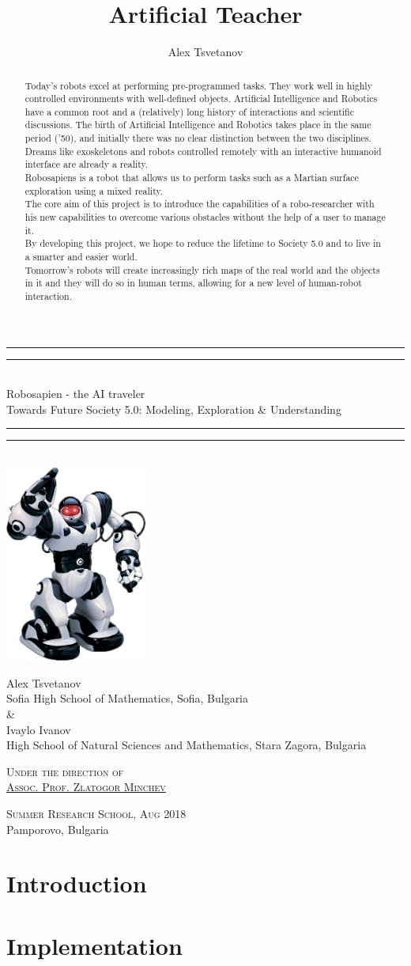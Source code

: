 \documentclass[a4paper, 12pt]{article}
\title{Artificial Teacher}
\author{Alex Tsvetanov}
\newcommand{\titleGP}{\begingroup
	\centering
	\rule{\textwidth}{1.6pt}\vspace{-\baselineskip}\vspace{2pt}
	\rule{\textwidth}{0.4pt}\\[\baselineskip]
	
	{\LARGE Robosapien - the AI traveler \\ \small{Towards Future Society 5.0: Modeling, Exploration \& Understanding}}\\[0.2\baselineskip]
	
	\rule{\textwidth}{0.4pt}\vspace{-\baselineskip}\vspace{3.2pt}
	\rule{\textwidth}{1.6pt}\\[\baselineskip]
		\includegraphics[width=0.35\textwidth]{robot.png}
	
	\vspace{50pt}
	{
	{\LARGE Alex Tsvetanov}\\
	{\normalsize Sofia High School of Mathematics, Sofia, Bulgaria}\\\vspace{0.5cm} \& \vspace{0.5cm} \\
	{\LARGE Ivaylo Ivanov}\\
	{\normalsize High School of Natural Sciences and Mathematics, Stara Zagora, Bulgaria}\par}
	
	\vspace{2\baselineskip}
	
	{\scshape \large
		Under the direction of \\
		\hspace{-0.3cm}\href{https://bg.linkedin.com/in/zlatogor-minchev-a101b85}{Assoc. Prof. Zlatogor Minchev} \\\par
	}
	\vspace{1cm}
	
	
	\vfill
	
	{\scshape Summer Research School, Aug 2018} \\[0.3\baselineskip]
	{\large Pamporovo, Bulgaria }\par
	
	\endgroup}
\begin{document}
	
	\titleGP
	\newpage
	
	\tableofcontents
	\newpage
	
	\begin{abstract}
		Today's robots excel at performing pre-programmed tasks. They work well in
		highly controlled environments with well-defined objects. Artificial Intelligence
		and Robotics have a common root and a (relatively) long history of interactions
		and scientific discussions. The birth of Artificial Intelligence and Robotics takes
		place in the same period ('50), and initially there was no clear distinction
		between the two disciplines. Dreams like exoskeletons and robots controlled
		remotely with an interactive humanoid interface are already a reality. \\
		
		Robosapiens is a robot that allows us to perform tasks such as a Martian surface
		exploration using a mixed reality.\\
		
		The core aim of this project is to introduce the capabilities of a robo-researcher with
		his new capabilities to overcome various obstacles without the help of a user to
		manage it.\\
		
		By developing this project, we hope to reduce the lifetime to Society 5.0 and to live in a smarter and easier world. \\
		
		Tomorrow's robots will create increasingly rich maps of the real world and the
		objects in it and they will do so in human terms, allowing for a new level of human-robot interaction.
	\end{abstract}
	\newpage
	
	\section{Introduction}
	
	\section{Implementation}
	
\end{document}

